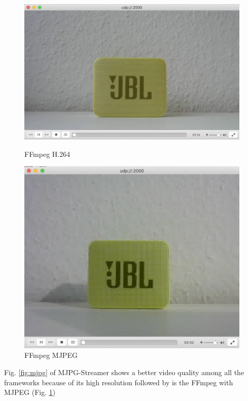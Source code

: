 \begin{figure}[ht]
\centering \begin{minipage}[b]{0.45\linewidth}
\includegraphics[width=\textwidth]{images/FFmpeg_H.264.png}
\caption{FFmpeg H.264} \label{fig:ffmpeg1}
\end{minipage}
\quad \begin{minipage}[b]{0.45\linewidth}
\includegraphics[width=\textwidth]{images/FFmpeg_MJPEG.png}
\caption{FFmpeg MJPEG} \label{fig:ffmpeg2}
\end{minipage}
\end{figure}

\newpage
Fig. \ref{fig:mjpg} of MJPG-Streamer shows a better video quality among all the frameworks because of its high resolution followed by is the FFmpeg with MJPEG (Fig. \ref{fig:ffmpeg2})

